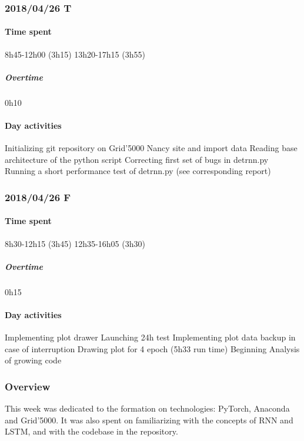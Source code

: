 \subsubsection{2018/04/26 T}
\paragraph{Time spent}
{8h45}-{12h00} (3h15)
{13h20}-{17h15} (3h55) 

\subparagraph{Overtime}
0h10

\paragraph{Day activities}
Initializing git repository on Grid'5000 Nancy site and import data
Reading base architecture of the python script
Correcting first set of bugs in detrnn.py
Running a short performance test of detrnn.py
(see corresponding report) 

\subsubsection{2018/04/26 F}
\paragraph{Time spent}
{8h30}-{12h15} (3h45)
{12h35}-{16h05} (3h30) 

\subparagraph{Overtime}
0h15

\paragraph{Day activities}
Implementing plot drawer
Launching 24h test
Implementing plot data backup in case of interruption
Drawing plot for 4 epoch (5h33 run time)
Beginning Analysis of growing code

\subsubsection{Overview}
This week was dedicated to the formation on technologies: PyTorch, Anaconda and Grid'5000. It was also spent on familiarizing with the concepts of RNN and LSTM, and with the codebase in the repository.
